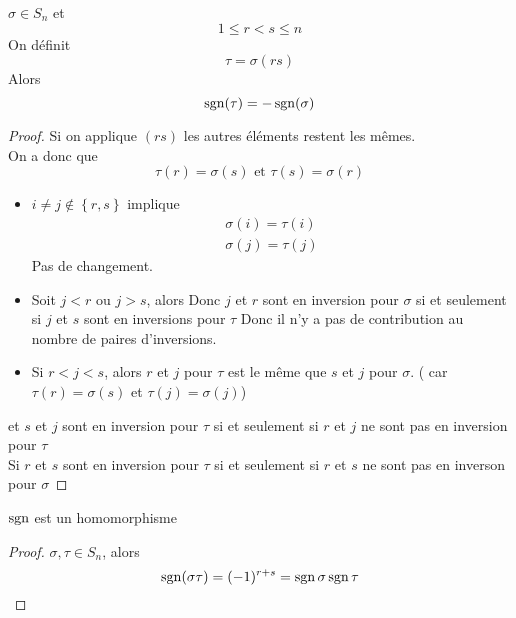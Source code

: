 \documentclass[../main.tex]{subfiles}
\begin{document}
\begin{lemma}
$\sigma \in S_n$ et
\[ 
1 \leq r < s \leq n
\]
On définit
\[ 
	\tau = \sigma( rs) 
\]
Alors
\[ 
	\operatorname*{sgn}( \tau) = - \operatorname*{sgn}( \sigma) 
\]

\end{lemma}
\begin{proof}
	Si on applique $( rs) $ les autres éléments restent les mêmes.\\
	On a donc que
	\[ 
		\tau( r) = \sigma( s) \text{ et } \tau( s) = \sigma( r) 
	\]
	
\begin{itemize}
\item $i\neq j \notin \left\{ r,s \right\} $ implique
	\begin{align*}
		\sigma( i) = \tau( i) \\
		\sigma( j) = \tau( j) 
	\end{align*}
Pas de changement.
\item Soit $j < r$ ou $j>s$, alors
	Donc $j$ et $r$ sont en inversion pour $\sigma$ si et seulement si $j$ et $s$ sont en inversions pour $\tau$
Donc il n'y a pas de contribution au nombre de paires d'inversions.
\item Si $r< j < s$, alors $r$ et $j$ pour $\tau$ est le même que $s$ et $j$ pour $\sigma$. ( car $\tau( r) = \sigma( s)$ et $\tau( j) = \sigma( j) $) 
\end{itemize}
et $s$ et $j$ sont en inversion pour $\tau$ si et seulement si $r$ et $j$ ne sont pas en inversion pour  $\tau$ \\
Si  $r$ et $s$ sont en inversion pour $\tau$ si et seulement si $r$
et $s$ ne sont pas en inverson pour $\sigma$
\end{proof}
\begin{crly}
$\operatorname*{sgn}$ est un homomorphisme
\end{crly}
\begin{proof}
$\sigma, \tau \in S_n$, alors
\[ 
	\operatorname*{sgn}( \sigma\tau) = ( -1) ^{r+s} = \operatorname*{sgn} \sigma \operatorname*{sgn} \tau
\]

\end{proof}
\end{document}
